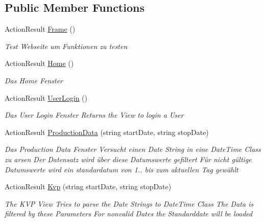 \subsection*{Public Member Functions}
\begin{DoxyCompactItemize}
\item 
Action\+Result \hyperlink{classkpi_mvc_api_1_1_controllers_1_1_home_controller_a8fe51f06ec9db44e1766f89691af44f6}{Frame} ()
\begin{DoxyCompactList}\small\item\em Test Webseite um Funktionen zu testen \end{DoxyCompactList}\item 
Action\+Result \hyperlink{classkpi_mvc_api_1_1_controllers_1_1_home_controller_a71cc0c383f8e44677455f0caf590e0a7}{Home} ()
\begin{DoxyCompactList}\small\item\em Das Home Fenster \end{DoxyCompactList}\item 
Action\+Result \hyperlink{classkpi_mvc_api_1_1_controllers_1_1_home_controller_a52ba84d65a16f3ec9f7c18ef46313b23}{User\+Login} ()
\begin{DoxyCompactList}\small\item\em Das User Login Fenster Returns the View to login a User \end{DoxyCompactList}\item 
Action\+Result \hyperlink{classkpi_mvc_api_1_1_controllers_1_1_home_controller_ae5c2fcc4413eda2cab2775cd9819efca}{Production\+Data} (string start\+Date, string stop\+Date)
\begin{DoxyCompactList}\small\item\em Das Production Data Fenster Versucht einen Date String in eine Date\+Time Class zu arsen Der Datensatz wird über diese Datumswerte gefiltert Für nicht gültige Datumswerte wird ein standardatum von 1.. bis zum aktuellen Tag gewählt \end{DoxyCompactList}\item 
Action\+Result \hyperlink{classkpi_mvc_api_1_1_controllers_1_1_home_controller_aab951608121b90d9424bb58c68bd0b23}{Kvp} (string start\+Date, string stop\+Date)
\begin{DoxyCompactList}\small\item\em The K\+VP View Tries to parse the Date Strings to Date\+Time Class The Data is filtered by these Parameters For nonvalid Dates the Standarddate will be loaded \end{DoxyCompactList}\item 

\end{DoxyCompactItemize}
